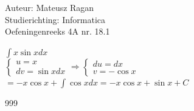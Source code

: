 \documentclass[a4paper]{article}
\begin{document}
\noindent \large Auteur: Mateusz Ragan \\
\noindent \large Studierichting: Informatica\\
\noindent \large Oefeningenreeks 4A nr. 18.1\\

\medskip

\normalsize

$\displaystyle\int x \sin x dx$\\

$\left\{
\begin{array}{l}
u = x\\
dv = \sin x dx
\end{array}
\right.
\Rightarrow
\left
\{\begin{array}{l}
du = dx\\
v = -\cos x 
\end{array}
\right.$\\

$= -x\cos x + \displaystyle\int \cos xdx = -x\cos x + \sin x + C$



\begin{thebibliography}{999}
\end{thebibliography}
\end{document}
